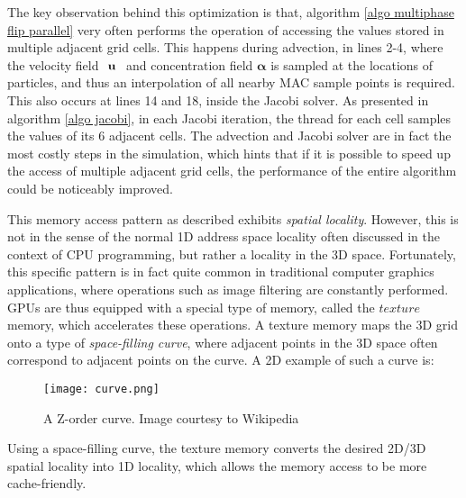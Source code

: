 The key observation behind this optimization is that, algorithm \ref{algo multiphase flip parallel} very often performs the operation of accessing the values stored in multiple adjacent grid cells. This happens during advection, in lines 2-4, where the velocity field $\textbf{ \textbf{u} }$ and concentration field $\bm{\alpha}$ is sampled at the locations of particles, and thus an interpolation of all nearby MAC sample points is required. This also occurs at lines 14 and 18, inside the Jacobi solver. As presented in algorithm \ref{algo jacobi}, in each Jacobi iteration, the thread for each cell samples the values of its 6 adjacent cells. The advection and Jacobi solver are in fact the most costly steps in the simulation, which hints that if it is possible to speed up the access of multiple adjacent grid cells, the performance of the entire algorithm could be noticeably improved.

This memory access pattern as described exhibits \textit{spatial locality}. However, this is not in the sense of the normal 1D address space locality often discussed in the context of CPU programming, but rather a locality in the 3D space. Fortunately, this specific pattern is in fact quite common in traditional computer graphics applications, where operations such as image filtering are constantly performed. GPUs are thus equipped with a special type of memory, called the $texture$ memory, which accelerates these operations. A texture memory maps the 3D grid onto a type of \textit{space-filling curve}, where adjacent points in the 3D space often correspond to adjacent points on the curve. A 2D example of such a curve is:

\begin{figure}[H]
    \centering
        \texttt{[image: curve.png]}
    \caption{A Z-order curve. Image courtesy to Wikipedia}
    \label{}
\end{figure}

Using a space-filling curve, the texture memory converts the desired 2D/3D spatial locality into 1D locality, which allows the memory access to be more cache-friendly. 


